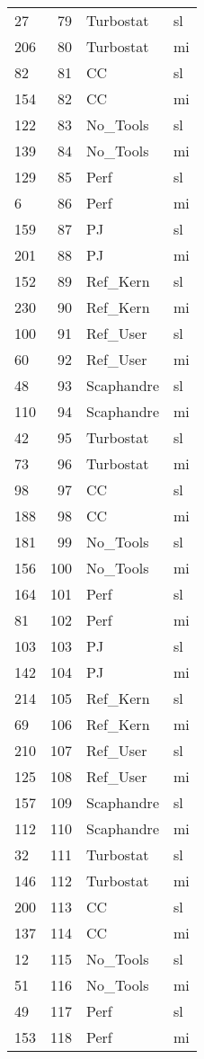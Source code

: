 \begin{tabular}{lrll}
27 & 79 & Turbostat & sl \\
206 & 80 & Turbostat & mi \\
82 & 81 & CC & sl \\
154 & 82 & CC & mi \\
122 & 83 & No_Tools & sl \\
139 & 84 & No_Tools & mi \\
129 & 85 & Perf & sl \\
6 & 86 & Perf & mi \\
159 & 87 & PJ & sl \\
201 & 88 & PJ & mi \\
152 & 89 & Ref_Kern & sl \\
230 & 90 & Ref_Kern & mi \\
100 & 91 & Ref_User & sl \\
60 & 92 & Ref_User & mi \\
48 & 93 & Scaphandre & sl \\
110 & 94 & Scaphandre & mi \\
42 & 95 & Turbostat & sl \\
73 & 96 & Turbostat & mi \\
98 & 97 & CC & sl \\
188 & 98 & CC & mi \\
181 & 99 & No_Tools & sl \\
156 & 100 & No_Tools & mi \\
164 & 101 & Perf & sl \\
81 & 102 & Perf & mi \\
103 & 103 & PJ & sl \\
142 & 104 & PJ & mi \\
214 & 105 & Ref_Kern & sl \\
69 & 106 & Ref_Kern & mi \\
210 & 107 & Ref_User & sl \\
125 & 108 & Ref_User & mi \\
157 & 109 & Scaphandre & sl \\
112 & 110 & Scaphandre & mi \\
32 & 111 & Turbostat & sl \\
146 & 112 & Turbostat & mi \\
200 & 113 & CC & sl \\
137 & 114 & CC & mi \\
12 & 115 & No_Tools & sl \\
51 & 116 & No_Tools & mi \\
49 & 117 & Perf & sl \\
153 & 118 & Perf & mi \\

\end{tabular}
